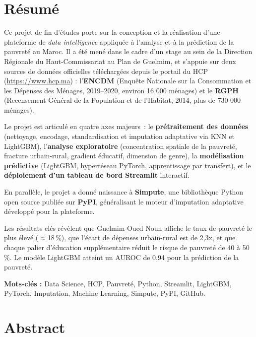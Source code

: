 \documentclass[12pt,a4paper]{report}
\begin{document}
\newpage
\chapter*{Résumé}

Ce projet de fin d'études porte sur la conception et la réalisation d'une plateforme de \textit{data intelligence} appliquée à l'analyse et à la prédiction de la pauvreté au Maroc. Il a été mené dans le cadre d'un stage au sein de la Direction Régionale du Haut-Commissariat au Plan de Guelmim, et s'appuie sur deux sources de données officielles téléchargées depuis le portail du HCP (\url{https://www.hcp.ma}) : l'\textbf{ENCDM} (Enquête Nationale sur la Consommation et les Dépenses des Ménages, 2019--2020, environ 16 000 ménages) et le \textbf{RGPH} (Recensement Général de la Population et de l'Habitat, 2014, plus de 730 000 ménages).

Le projet est articulé en quatre axes majeurs~: le \textbf{prétraitement des données} (nettoyage, encodage, standardisation et imputation adaptative via KNN et LightGBM), l'\textbf{analyse exploratoire} (concentration spatiale de la pauvreté, fracture urbain-rural, gradient éducatif, dimension de genre), la \textbf{modélisation prédictive} (LightGBM, hyperréseau PyTorch, apprentissage par transfert), et le \textbf{déploiement d'un tableau de bord Streamlit} interactif.

En parallèle, le projet a donné naissance à \textbf{Simpute}, une bibliothèque Python open source publiée sur \textbf{PyPI}, généralisant le moteur d'imputation adaptative développé pour la plateforme.

Les résultats clés révèlent que Guelmim-Oued Noun affiche le taux de pauvreté le plus élevé ($\approx$18\,\%), que l'écart de dépenses urbain-rural est de 2,3x, et que chaque palier d'éducation supplémentaire réduit le risque de pauvreté de 40 à 50\,\%. Le modèle LightGBM atteint un AUROC de 0,94 pour la prédiction de la pauvreté.

\vspace{0.4cm}
\noindent\textbf{Mots-clés :} Data Science, HCP, Pauvreté, Python, Streamlit, LightGBM, PyTorch, Imputation, Machine Learning, Simpute, PyPI, GitHub.

\newpage
\chapter*{Abstract}
\end{document}

